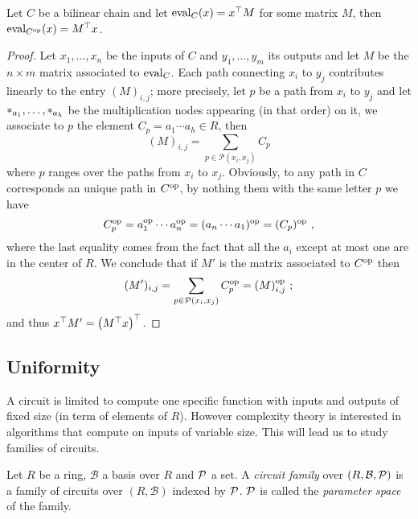 \begin{corollary}
  Let $C$ be a bilinear chain and let $\operatorname{eval}_C(x)=x^\top M$ for some
  matrix $M$, then $\operatorname{eval}_{C^{\mathrm{op}}}(x)=M^\top x$.
\end{corollary}
\begin{proof}
  Let $x_1,\ldots,x_n$ be the inputs of $C$ and $y_1,\ldots,y_m$ its
  outputs and let $M$ be the $n\times m$ matrix associated to
  $\operatorname{eval}_C$. Each path connecting $x_i$ to $y_j$ contributes linearly
  to the entry $(M)_{i,j}$; more precisely, let $p$ be a path from
  $x_i$ to $y_j$ and let $*_{a_1},\ldots,*_{a_h}$ be the
  multiplication nodes appearing (in that order) on it, we associate
  to $p$ the element $C_p=a_1\cdots a_h\in R$, then
  \begin{equation}
    (M)_{i,j}=\sum_{p\in\mathcal{P}(x_i,x_j)}C_p
  \end{equation}
  where $p$ ranges over the paths from $x_i$ to $x_j$. Obviously, to
  any path in $C$ corresponds an unique path in $C^{\mathrm{op}}$, by nothing
  them with the same letter $p$ we have
  \begin{equation}
    C_p^{\mathrm{op}}=a_1^{\mathrm{op}}\cdots a_n^{\mathrm{op}}=(a_n\cdots a_1)^{\mathrm{op}}=(C_p)^{\mathrm{op}}
    \text{ ,}
  \end{equation}
  where the last equality comes from the fact that all the $a_i$
  except at most one are in the center of $R$. We conclude that if
  $M'$ is the matrix associated to $C^{\mathrm{op}}$ then
  \begin{equation}
    (M')_{i,j}=\sum_{p\in\mathcal{P}(x_i,x_j)}C_p^{\mathrm{op}}=(M)_{i,j}^{\mathrm{op}}
    \text{ ;}
  \end{equation}
  and thus $x^\top M'=\left(M^\top x\right)^\top$.
\end{proof}



\subsection{Uniformity}
\label{sec:uniformity}

A circuit is limited to compute one specific function with inputs and
outputs of fixed size (in term of elements of $R$). However complexity
theory is interested in algorithms that compute on inputs of variable
size. This will lead us to study families of circuits.

\begin{definition}
  Let $R$ be a ring, $\mathcal{B}$ a basis over $R$ and $\mathcal{P}$ a
  set. A \emph{circuit family} over $(R,\mathcal{B},\mathcal{P})$ is a
  family of circuits over $(R,\mathcal{B})$ indexed by $\mathcal{P}$.
  $\mathcal{P}$ is called the \emph{parameter space} of the family.
\end{definition}

